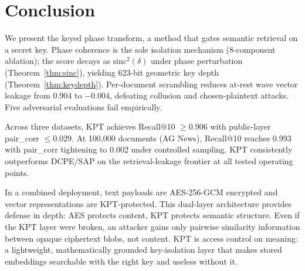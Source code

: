 \documentclass{article}
\begin{document}
\section{Conclusion}
\label{sec:conclusion}

We present the keyed phase transform, a method that gates semantic retrieval on a secret key.
Phase coherence is the sole isolation mechanism (8-component ablation); the score decays as $\mathrm{sinc}^2(\delta)$ under phase perturbation (Theorem~\ref{thm:sinc}), yielding 623-bit geometric key depth (Theorem~\ref{thm:keydepth}).
Per-document scrambling reduces at-rest wave vector leakage from 0.904 to $-0.004$, defeating collusion and chosen-plaintext attacks.
Five adversarial evaluations fail empirically.

Across three datasets, KPT achieves Recall@10 $\geq 0.906$ with public-layer pair\_corr $\leq 0.029$.
At 100{,}000 documents (AG News), Recall@10 reaches 0.993 with pair\_corr tightening to 0.002 under controlled sampling.
KPT consistently outperforms DCPE/SAP on the retrieval-leakage frontier at all tested operating points.

In a combined deployment, text payloads are AES-256-GCM encrypted and vector representations are KPT-protected. This dual-layer architecture provides defense in depth: AES protects content, KPT protects semantic structure. Even if the KPT layer were broken, an attacker gains only pairwise similarity information between opaque ciphertext blobs, not content. KPT is access control on meaning: a lightweight, mathematically grounded key-isolation layer that makes stored embeddings searchable with the right key and useless without it.




\end{document}
